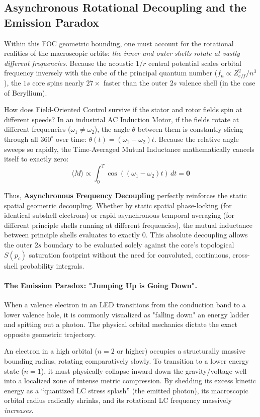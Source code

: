 \subsection{Asynchronous Rotational Decoupling and the Emission Paradox}
Within this FOC geometric bounding, one must account for the rotational realities of the macroscopic orbits: \textit{the inner and outer shells rotate at vastly different frequencies}. Because the acoustic $1/r$ central potential scales orbital frequency inversely with the cube of the principal quantum number ($f_n \propto Z_{eff}^2 / n^3$), the $1s$ core spins nearly $27\times$ faster than the outer $2s$ valence shell (in the case of Beryllium).

How does Field-Oriented Control survive if the stator and rotor fields spin at different speeds?
In an industrial AC Induction Motor, if the fields rotate at different frequencies ($\omega_1 \neq \omega_2$), the angle $\theta$ between them is constantly slicing through all $360^\circ$ over time: $\theta(t) = (\omega_1 - \omega_2)t$. Because the relative angle sweeps so rapidly, the Time-Averaged Mutual Inductance mathematically cancels itself to exactly zero:
\begin{equation}
    \langle M \rangle \propto \int_0^T \cos((\omega_1 - \omega_2)t) \, dt = \mathbf{0}
\end{equation}

Thus, \textbf{Asynchronous Frequency Decoupling} perfectly reinforces the static spatial geometric decoupling. Whether by static spatial phase-locking (for identical subshell electrons) or rapid asynchronous temporal averaging (for different principle shells running at different frequencies), the mutual inductance between principle shells evaluates to exactly 0. This absolute decoupling allows the outer $2s$ boundary to be evaluated solely against the core's topological $S(p_c)$ saturation footprint without the need for convoluted, continuous, cross-shell probability integrals.

\paragraph{The Emission Paradox: "Jumping Up is Going Down".}
When a valence electron in an LED transitions from the conduction band to a lower valence hole, it is commonly visualized as "falling down" an energy ladder and spitting out a photon. The physical orbital mechanics dictate the exact opposite geometric trajectory. 

An electron in a high orbital ($n=2$ or higher) occupies a structurally massive bounding radius, rotating comparatively slowly. To transition to a lower energy state ($n=1$), it must physically collapse inward down the gravity/voltage well into a localized zone of intense metric compression. By shedding its excess kinetic energy as a ``quantized LC stress splash'' (the emitted photon), its macroscopic orbital radius radically shrinks, and its rotational LC frequency massively \textit{increases}. 

